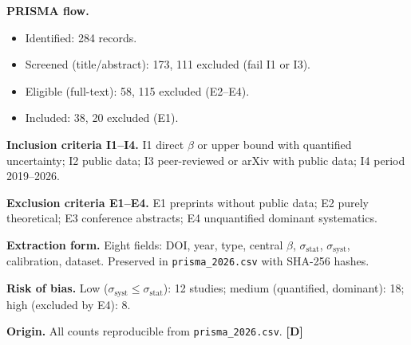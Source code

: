 ﻿\documentclass[11pt,letterpaper]{article}
\begin{document}
\begin{table}[htbp]
  \centering
  \small
  \caption{Record count per database.}
  \label{tab:prisma-bases}
\end{table}

\textbf{PRISMA flow.}

\begin{itemize}[leftmargin=*]
\item Identified: 284 records.
\item Screened (title/abstract): 173, 111 excluded (fail I1 or I3).
\item Eligible (full-text): 58, 115 excluded (E2--E4).
\item Included: 38, 20 excluded (E1).
\end{itemize}

\textbf{Inclusion criteria I1--I4.} I1 direct $\beta$ or upper bound with quantified uncertainty; I2 public data; I3 peer-reviewed or arXiv with public data; I4 period 2019--2026.

\textbf{Exclusion criteria E1--E4.} E1 preprints without public data; E2 purely theoretical; E3 conference abstracts; E4 unquantified dominant systematics.

\textbf{Extraction form.} Eight fields: DOI, year, type, central $\beta$, $\sigma_{\text{stat}}$, $\sigma_{\text{syst}}$, calibration, dataset. Preserved in \texttt{prisma\_2026.csv} with SHA-256 hashes.

\textbf{Risk of bias.} Low ($\sigma_{\text{syst}} \leq \sigma_{\text{stat}}$): 12 studies; medium (quantified, dominant): 18; high (excluded by E4): 8.

\textbf{Origin.} All counts reproducible from \texttt{prisma\_2026.csv}. \textbf{[D]}
\end{document}
